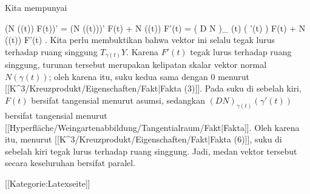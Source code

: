 Kita mempunyai

\mavergleichskettealign
{\vergleichskettealign
{ (N (\gamma(t)) \times F(t))'
}
{ =} { (N (\gamma(t)))' \times F(t) +  N (\gamma(t)) \times F'(t)
}
{ =} { \left(  D N   \right)_{ \gamma(t)} \left(   \gamma'(t)   \right)  \times F(t) +  N (\gamma(t)) \times F'(t)
}
{ } {
}
{ } {
}
}
{}
{}{.}
Kita perlu membuktikan bahwa vektor ini selalu tegak lurus terhadap ruang singgung $T_{\gamma(t)}Y$. Karena $F'(t)$ tegak lurus terhadap ruang singgung, turunan tersebut merupakan kelipatan skalar vektor normal $N(\gamma(t))$; oleh karena itu, suku kedua sama dengan $0$ menurut
[[K^3/Kreuzprodukt/Eigenschaften/Fakt|Fakta (3)]].
Pada suku di sebelah kiri, $F(t)$ bersifat tangensial menurut asumsi, sedangkan $\left(  D N   \right)_{ \gamma(t)} \left(   \gamma'(t)   \right)$ bersifat tangensial menurut
[[Hyperfläche/Weingartenabbildung/Tangentialraum/Fakt|Fakta]].
Oleh karena itu, menurut
[[K^3/Kreuzprodukt/Eigenschaften/Fakt|Fakta (6)]],
suku di sebelah kiri tegak lurus terhadap ruang singgung. Jadi, medan vektor tersebut secara keseluruhan bersifat paralel.

 [[Kategorie:Latexseite]]
